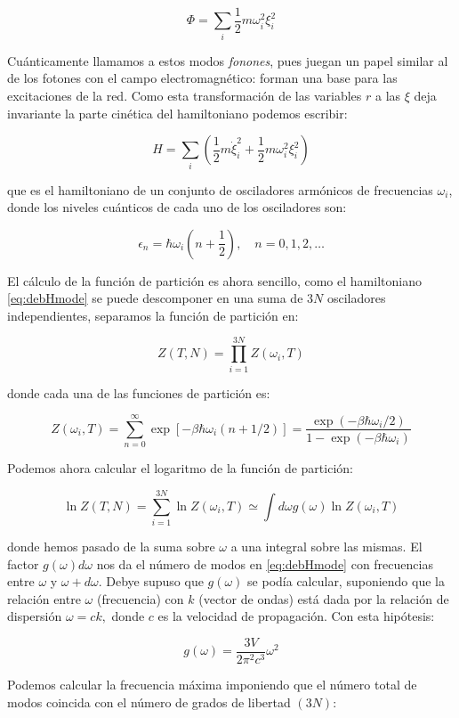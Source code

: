 \documentclass[11pt, a4paper]{article} %
\theoremstyle{named}
\begin{document}
$$
\Phi=\sum_{i} \frac{1}{2} m \omega_{i}^{2} \xi_{i}^{2}
$$

Cuánticamente llamamos a estos modos \textit{fonones}, pues juegan un papel similar al de los fotones con el campo electromagnético: forman una base para las excitaciones de la red. Como esta transformación de las variables $r$ a las $\xi$ deja invariante la parte cinética del hamiltoniano podemos escribir:

\begin{equation}\label{eq:debHmode}
    H=\sum_{i}\left(\frac{1}{2} m \dot{\xi}_{i}^{2}+\frac{1}{2} m \omega_{i}^{2} \xi_{i}^{2}\right)
\end{equation}

que es el hamiltoniano de un conjunto de osciladores armónicos de frecuencias $\omega_i$, donde los niveles cuánticos de cada uno de los osciladores son:

$$
\epsilon_n = \hbar \omega_{i}\left(n+\frac{1}{2}\right),\quad n=0,1,2, \ldots
$$

El cálculo de la función de partición es ahora sencillo, como el hamiltoniano \eqref{eq:debHmode} se puede descomponer en una suma de $3N$ osciladores independientes, separamos la función de partición en:

$$
Z(T, N)=\prod_{i=1}^{3 N} Z\left(\omega_{i}, T\right)
$$

donde cada una de las funciones de partición es:

$$
Z\left(\omega_{i}, T\right)=\sum_{n=0}^{\infty} \exp \left[-\beta \hbar \omega_{i}(n+1 / 2)\right]=\frac{\exp \left(-\beta \hbar \omega_{i} / 2\right)}{1-\exp \left(-\beta \hbar \omega_{i}\right)}
$$

Podemos ahora calcular el logaritmo de la función de partición:

$$
\ln Z(T, N)=\sum_{i=1}^{3 N} \ln Z\left(\omega_{i}, T\right) \simeq \int d \omega g(\omega) \ln Z\left(\omega_{i}, T\right)
$$

donde hemos pasado de la suma sobre $\omega$ a una integral sobre las mismas. El factor $g(\omega) d \omega$ nos da el número de modos en \eqref{eq:debHmode} con frecuencias entre $\omega$ y $\omega+d \omega$. Debye supuso que $g(\omega)$ se podía calcular, suponiendo que la relación entre $\omega$ (frecuencia) con $k$ (vector de ondas) está dada por la relación de dispersión $\omega=c k,$ donde $c$ es la velocidad de propagación. Con esta hipótesis:

$$
g(\omega)=\frac{3 V}{2 \pi^{2} c^{3}} \omega^{2}
$$

Podemos calcular la frecuencia máxima imponiendo que el número total de modos coincida con el número de grados de libertad $(3 N)$:
\end{document}
